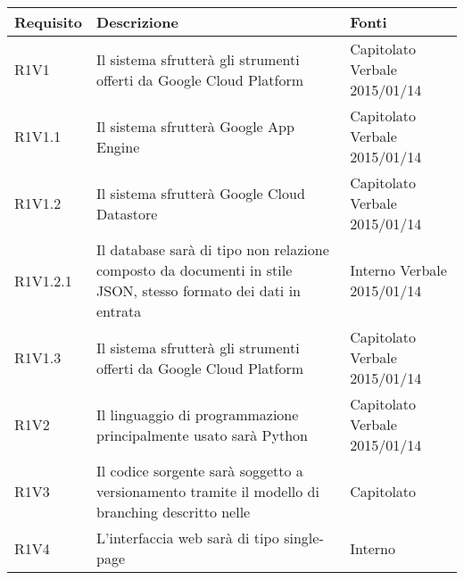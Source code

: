 \begin{center}

	\def\arraystretch{1.5}
	\bgroup
	\begin{longtable}{| p{2cm} | p{8cm} | p{2cm} |}

		\hline
		\textbf{Requisito} & \textbf{Descrizione} & \textbf{Fonti} \\
		\hline

		R1V1  &  Il sistema sfrutterà gli strumenti offerti da Google Cloud Platform  &  Capitolato \newline Verbale 2015/01/14 \\
		\hline
		R1V1.1  &  Il sistema sfrutterà Google App Engine  &  Capitolato \newline Verbale 2015/01/14 \\
		\hline
		R1V1.2  &  Il sistema sfrutterà Google Cloud Datastore  &  Capitolato \newline Verbale 2015/01/14 \\
		\hline
		R1V1.2.1  &  Il database sarà di tipo non relazione composto da documenti in stile JSON, stesso formato dei dati in entrata  &  Interno \newline Verbale 2015/01/14 \\
		\hline
		R1V1.3  &  Il sistema sfrutterà gli strumenti offerti da Google Cloud Platform  &  Capitolato \newline Verbale 2015/01/14 \\
		\hline
		R1V2  &  Il linguaggio di programmazione principalmente usato sarà Python  &  Capitolato \newline Verbale 2015/01/14 \\
		\hline
		R1V3  &  Il codice sorgente sarà soggetto a versionamento tramite il modello di branching descritto nelle \docNameVersionNdP  &  Capitolato \\
		\hline
		R1V4  &  L'interfaccia web sarà di tipo single-page  &  Interno \\
		\hline

	\end{longtable}
	\egroup
\end{center}

